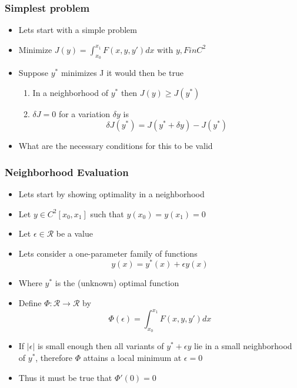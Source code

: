 \documentclass[10pt]{beamer}
\begin{document}
\begin{frame}
  \frametitle{Simplest problem}
  \begin{itemize}
  \item Lets start with a simple problem
  \item Minimize $J(y) = \int_{x_0}^{x_1} F(x, y, y') dx$ with $y, F in C^2$
  \item Suppose $y^*$ minimizes J it would then be true
    \begin{enumerate}
    \item In a neighborhood of $y^*$ then $J(y) \geq J(y^*)$
    \item $\delta J = 0$ for a variation $\delta y$ is
      \[
        \delta J(y^*) = J(y^* + \delta y) - J(y^*)
      \]
    \end{enumerate}
  \item What are the necessary conditions for this to be valid
  \end{itemize}
\end{frame}

\begin{frame}
  \frametitle{Neighborhood Evaluation}
  \begin{itemize}
  \item Lets start by showing optimality in a neighborhood
  \item Let $y \in C^2[x_0, x_1]$ such that $y(x_0) = y(x_1) = 0$
  \item Let   $\epsilon \in \mathcal{R}$ be a value
  \item Lets consider a one-parameter family of functions
    \[
      y(x) = y^*(x) + \epsilon y(x)
    \]
  \item Where $y^*$ is the (unknown) optimal function
  \item Define $\Phi: \mathcal{R} \rightarrow \mathcal{R}$ by
    \[
      \Phi(\epsilon) = \int_{x_0}^{x_1} F(x, y, y') dx
    \]
  \item If $|\epsilon|$ is small enough then all variants of
    $y^* + \epsilon y$ lie in a small neighborhood of $y^*$,
    therefore $\Phi$ attains a local minimum at $\epsilon = 0$
  \item Thus it must be true that  $\Phi'(0) = 0$
  \end{itemize}
\end{frame}
\end{document}
